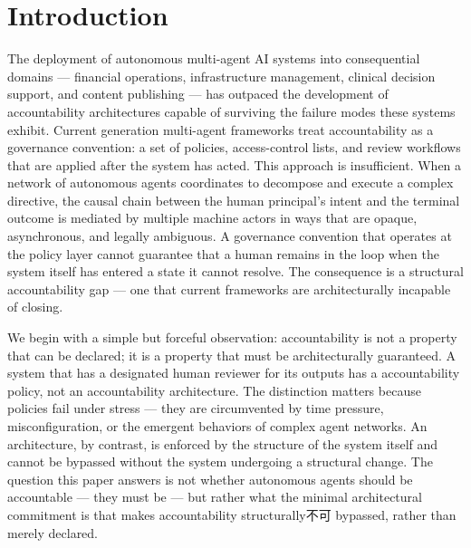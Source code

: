 \section{Introduction}
\label{sec:introduction}

The deployment of autonomous multi-agent AI systems into consequential domains — financial operations, infrastructure management, clinical decision support, and content publishing — has outpaced the development of accountability architectures capable of surviving the failure modes these systems exhibit. Current generation multi-agent frameworks treat accountability as a governance convention: a set of policies, access-control lists, and review workflows that are applied after the system has acted. This approach is insufficient. When a network of autonomous agents coordinates to decompose and execute a complex directive, the causal chain between the human principal's intent and the terminal outcome is mediated by multiple machine actors in ways that are opaque, asynchronous, and legally ambiguous. A governance convention that operates at the policy layer cannot guarantee that a human remains in the loop when the system itself has entered a state it cannot resolve. The consequence is a structural accountability gap — one that current frameworks are architecturally incapable of closing.

We begin with a simple but forceful observation: accountability is not a property that can be declared; it is a property that must be architecturally guaranteed. A system that has a designated human reviewer for its outputs has a accountability policy, not an accountability architecture. The distinction matters because policies fail under stress — they are circumvented by time pressure, misconfiguration, or the emergent behaviors of complex agent networks. An architecture, by contrast, is enforced by the structure of the system itself and cannot be bypassed without the system undergoing a structural change. The question this paper answers is not whether autonomous agents should be accountable — they must be — but rather what the minimal architectural commitment is that makes accountability structurally不可 bypassed, rather than merely declared.

